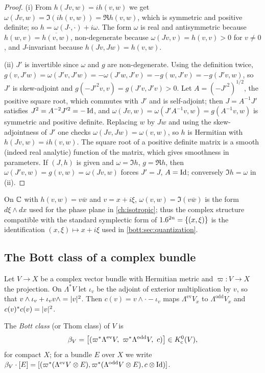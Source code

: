 \begin{proof}
  (i) From $h(Jv,w)=ih(v,w)$ we get $\omega(Jv,w)=\Im(ih(v,w))=\Re h(v,w)$, which is symmetric
  and positive definite; so $h=\omega(J\cdot,\cdot)+i\omega$. The form $\omega$ is real and
  antisymmetric because $h(w,v)=\overline{h(v,w)}$, non-degenerate because
  $\omega(Jv,v)=h(v,v)>0$ for $v\ne0$, and $J$-invariant because $h(Jv,Jw)=h(v,w)$.

  (ii) $J'$ is invertible since $\omega$ and $g$ are non-degenerate. Using the definition twice,
  $g(v,J'w)=\omega(J'v,J'w)=-\omega(J'w,J'v)=-g(w,J'v)=-g(J'v,w)$, so $J'$ is skew-adjoint and
  $g(-J'^2v,v)=g(J'v,J'v)>0$. Let $A=(-J'^2)^{1/2}$, the positive square root, which commutes
  with $J'$ and is self-adjoint; then $J=A^{-1}J'$ satisfies $J^2=A^{-2}J'^2=-\operatorname{Id}$, and
  $\omega(Jv,w)=\omega(J'A^{-1}v,w)=g(A^{-1}v,w)$ is symmetric and positive definite. Replacing $w$
  by $Jw$ and using the skew-adjointness of $J'$ one checks $\omega(Jv,Jw)=\omega(v,w)$, so $h$ is
  Hermitian with $h(Jv,w)=ih(v,w)$. The square root of a positive definite matrix is a
  smooth (indeed real analytic) function of the matrix, which gives smoothness in
  parameters. If $(J,h)$ is given and $\omega=\Im h$, $g=\Re h$, then $\omega(J'v,w)=g(v,w)=\omega(Jv,w)$
  forces $J'=J$, $A=\operatorname{Id}$; conversely $\Im h=\omega$ in (ii).
\end{proof}

On $\mathbb{C}$ with $h(v,w)=v\bar w$ and $v=x+i\xi$, $\omega(v,w)=\Im(v\bar w)$ is the form
$d\xi\wedge dx$ used for the phase plane in \cref{ch:isotropic}; thus the complex structure
compatible with the standard symplectic form of $1.6^{2n}=\{(x,\xi)\}$ is the
identification $(x,\xi)\mapsto x+i\xi$ used in \cref{bott:sec:quantization}.

\subsection{The Bott class of a complex bundle}
Let $V\to X$ be a complex vector bundle with Hermitian metric and $\varpi\colon V\to X$ the
projection. On $\Lambda^*V$ let $\iota_v$ be the adjoint of exterior multiplication by
$v$, so that $v\wedge\iota_v+\iota_v v\wedge=\lvert v\rvert^2$. Then
$c(v)=v\wedge\cdot-\iota_v$ maps $\Lambda^{\mathrm{ev}}V_x$ to $\Lambda^{\mathrm{odd}}V_x$ and
$c(v)^*c(v)=\lvert v\rvert^2$.

\begin{definition}\label{bott:def:bott-class}
  The \emph{Bott class} (or Thom class) of $V$ is
  \begin{equation*}
    \beta_V=\bigl[(\varpi^*\Lambda^{\mathrm{ev}}V,\ \varpi^*\Lambda^{\mathrm{odd}}V,\ c)\bigr]\in\Kc^0(V),
  \end{equation*}
  for compact $X$; for a bundle $E$ over $X$ we write
  $\beta_V\cdot[E]=[(\varpi^*(\Lambda^{\mathrm{ev}}V\otimes E),\varpi^*(\Lambda^{\mathrm{odd}}V\otimes E),c\otimes\operatorname{Id})]$.
\end{definition}

